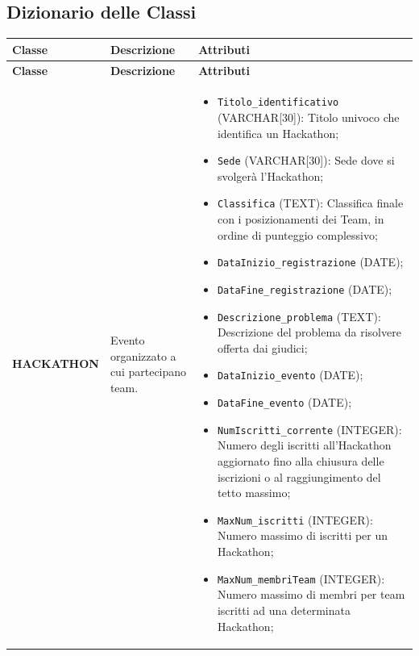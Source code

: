 \documentclass[a4paper, 11pt]{article}
\renewcommand{\arraystretch}{1.2} %
\begin{document}
	\subsection{Dizionario delle Classi}
	{\footnotesize %
		\setlength{\arrayrulewidth}{0.5pt}  %
		\renewcommand{\arraystretch}{1.2}  %
		\begin{longtable}{
			>{\raggedright\arraybackslash}p{4cm} %
			>{\centering\arraybackslash}p{4cm}    %
			>{\raggedright\arraybackslash}p{6.5cm}%
			}
			\hline
			\textbf{Classe} & \textbf{Descrizione} & \textbf{Attributi} \\
			\hline
			\endfirsthead
			\hline
			\textbf{Classe} & \textbf{Descrizione} & \textbf{Attributi} \\
			\hline
			\endhead
			\hline
			\endfoot
			\hline
			\endlastfoot
			
			\textbf{HACKATHON} &
			Evento organizzato a cui partecipano team. &
			\begin{itemize}
				\item \texttt{Titolo\_identificativo} (VARCHAR[30]): Titolo univoco che identifica un Hackathon;
				\item \texttt{Sede} (VARCHAR[30]): Sede dove si svolgerà l'Hackathon;
				\item \texttt{Classifica} (TEXT): Classifica finale con i posizionamenti dei Team, in ordine di punteggio complessivo;
				\item \texttt{DataInizio\_registrazione} (DATE);
				\item \texttt{DataFine\_registrazione} (DATE);
				\item \texttt{Descrizione\_problema} (TEXT): Descrizione del problema da risolvere offerta dai giudici;
				\item \texttt{DataInizio\_evento} (DATE);
				\item \texttt{DataFine\_evento} (DATE);
				\item \texttt{NumIscritti\_corrente} (INTEGER): Numero degli iscritti all'Hackathon aggiornato fino alla chiusura delle iscrizioni o al raggiungimento del tetto massimo;
				\item \texttt{MaxNum\_iscritti} (INTEGER): Numero massimo di iscritti per un Hackathon;
				\item \texttt{MaxNum\_membriTeam} (INTEGER): Numero massimo di membri per team iscritti ad una determinata Hackathon;
			\end{itemize} \\
			\hline
			

\end{longtable}}
\end{document}
